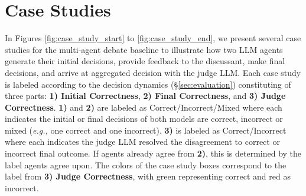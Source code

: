 \documentclass[11pt]{article}
\begin{document}





\section{Case Studies}
\label{appendix:detailed_case_studies}

In Figures \ref{fig:case_study_start} to \ref{fig:case_study_end}, we present several case studies for the multi-agent debate baseline to illustrate how two LLM agents generate their initial decisions, provide feedback to the discussant, make final decisions, and arrive at aggregated decision with the judge LLM. Each case study is labeled according to the decision dynamics (\S \ref{sec:evaluation}) constituting of three parts: \textbf{1) Initial Correctness}, \textbf{2) Final Correctness}, and \textbf{3) Judge Correctness}. \textbf{1)} and \textbf{2)} are labeled as Correct/Incorrect/Mixed where each indicates the initial or final decisions of both models are correct, incorrect or mixed (\textit{e.g.,} one correct and one incorrect). \textbf{3)} is labeled as Correct/Incorrect where each indicates the judge LLM resolved the disagreement to correct or incorrect final outcome. If agents already agree from \textbf{2)}, this is determined by the label agents agree upon. The colors of the case study boxes correspond to the label from \textbf{3) Judge Correctness}, with \textcolor{box_green}{green} representing correct and \textcolor{box_red}{red} as incorrect.















\clearpage

\clearpage






% 
% 

% 
% 

% 
% 
% 
% 
\end{document}
